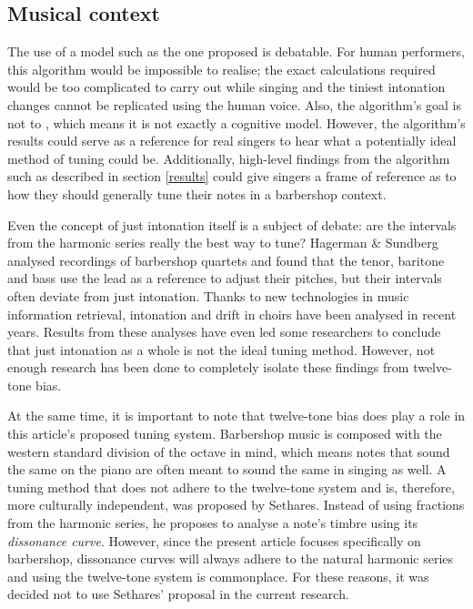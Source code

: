 \documentclass[a4paper]{article}
\begin{document}
\subsection{Musical context}
The use of a model such as the one proposed is debatable. For human performers, this algorithm would be impossible to realise; the exact calculations required would be too complicated to carry out while singing and the tiniest intonation changes cannot be replicated using the human voice. Also, the algorithm's goal is not to , which means it is not exactly a cognitive model. \cite{van_maanen_interpretation_2021} However, the algorithm's results could serve as a reference for real singers to hear what a potentially ideal method of tuning could be. Additionally, high-level findings from the algorithm such as described in section \ref{results} could give singers a frame of reference as to how they should generally tune their notes in a barbershop context.

Even the concept of just intonation itself is a subject of debate: are the intervals from the harmonic series really the best way to tune? Hagerman \& Sundberg analysed recordings of barbershop quartets and found that the tenor, baritone and bass use the lead as a reference to adjust their pitches, but their intervals often deviate from just intonation. \cite{hagerman_fundamental_1980} Thanks to new technologies in music information retrieval, intonation and drift in choirs have been analysed in recent years. \cite{devaney_study_2012, mauch_intonation_2014, dai_intonation_2019} Results from these analyses have even led some researchers to conclude that just intonation as a whole is not the ideal tuning method. \cite{parncutt_psychocultural_2018} However, not enough research has been done to completely isolate these findings from twelve-tone bias.

At the same time, it is important to note that twelve-tone bias does play a role in this article's proposed tuning system. Barbershop music is composed with the western standard division of the octave in mind, which means notes that sound the same on the piano are often meant to sound the same in singing as well. A tuning method that does not adhere to the twelve-tone system and is, therefore, more culturally independent, was proposed by Sethares. \cite{sethares_adaptive_1994} Instead of using fractions from the harmonic series, he proposes to analyse a note's timbre using its \textit{dissonance curve}. However, since the present article focuses specifically on barbershop, dissonance curves will always adhere to the natural harmonic series and using the twelve-tone system is commonplace. For these reasons, it was decided not to use Sethares' proposal in the current research.
\end{document}
